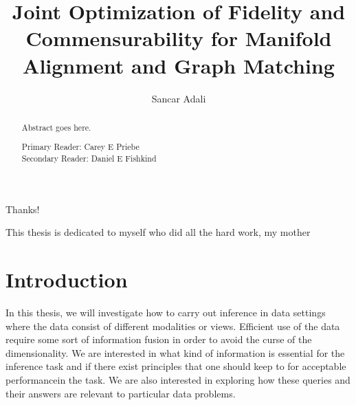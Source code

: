 \documentclass[12pt,oneside,final]{thesis}\usepackage[]{graphicx}\usepackage[]{color}
\begin{document}
\title{Joint Optimization of Fidelity and Commensurability for Manifold Alignment and Graph Matching}
\author{Sancar Adali}
\dissertation
\doctorphilosophy
\copyrightnotice





\begin{frontmatter}

\maketitle

\begin{abstract}

Abstract goes here.

\vspace{1cm}

\noindent Primary Reader: Carey E Priebe\\
Secondary Reader: Daniel E Fishkind

\end{abstract}

\begin{acknowledgment}

Thanks!

\end{acknowledgment}

\begin{dedication}
 
This thesis is dedicated to myself who did all the hard work, my mother 

\end{dedication}

\tableofcontents

\listoftables

\listoffigures


\printnomenclature

\end{frontmatter}




\chapter{Introduction}
\label{sec:intro}


In this thesis, we will investigate how to carry out inference in  data  settings where the data consist of different modalities or views. Efficient use of the data require some sort of information fusion in order to avoid the curse of the dimensionality. We are interested in what kind of information is essential for the inference task and if there exist principles that one should keep to for acceptable performancein the task. We are also interested in exploring how these  queries and their answers are  relevant to  particular data problems.
\end{document}
